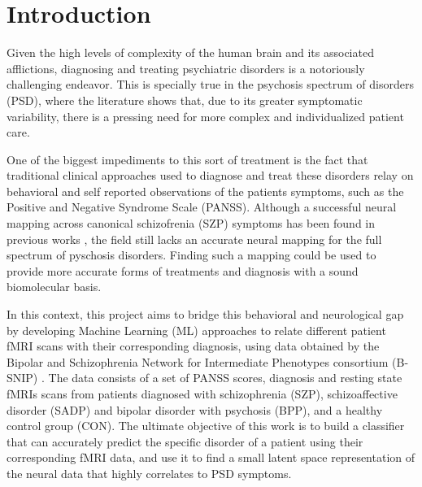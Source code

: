 \documentclass[fleqn,moreauthors,10pt]{ds_report}
\affiliation{\textit{Advisors: Prof. Dr. Jure Demšar}}
\begin{document}
\flushbottom 

\maketitle 

\thispagestyle{empty} 


\section*{Introduction}

    Given the high levels of complexity of the human brain and its associated afflictions, diagnosing and treating psychiatric disorders is a notoriously challenging endeavor. This is specially true in the psychosis spectrum of disorders (PSD), where the literature shows that, due to its greater symptomatic variability, there is a pressing need for more complex and individualized patient care.

    One of the biggest impediments to this sort of treatment is the fact that traditional clinical approaches used to diagnose and treat these disorders relay on behavioral and self reported observations of the patients symptoms, such as the Positive and Negative Syndrome Scale (PANSS). Although a successful neural mapping across canonical schizofrenia (SZP) symptoms has been found in previous works \cite{Chen2020}, the field still lacks an accurate neural mapping for the full spectrum of pyschosis disorders. Finding such a mapping could be used to provide more accurate forms of treatments and diagnosis with a sound biomolecular basis.

    In this context, this project aims to bridge this behavioral and neurological gap by developing Machine Learning (ML) approaches to relate different patient fMRI scans with their corresponding diagnosis, using data obtained by the Bipolar and Schizophrenia Network for Intermediate Phenotypes consortium (B-SNIP) \cite{Clementz2016}. The data consists of a set of PANSS scores, diagnosis and resting state fMRIs scans from patients diagnosed with schizophrenia (SZP), schizoaffective disorder (SADP) and bipolar disorder with psychosis (BPP), and a healthy control group (CON). The ultimate objective of this work is to build a classifier that can accurately predict the specific disorder of a patient using their corresponding fMRI data, and use it to find a small latent space representation of the neural data that highly correlates to PSD symptoms.
    
\end{document}
